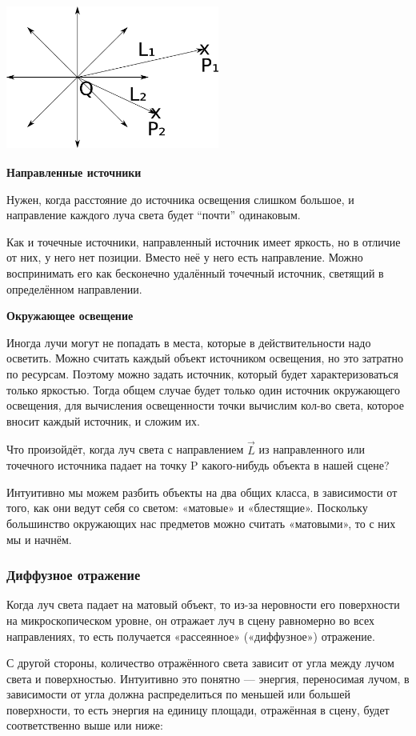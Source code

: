 \includegraphics[width=7cm, height=4.8cm]{light_vectors.png}

\textbf{Направленные источники}

Нужен, когда расстояние до источника освещения слишком большое, и направление каждого луча света будет “почти” одинаковым.

Как и точечные источники, направленный источник имеет яркость, но в отличие от них, у него нет позиции. Вместо неё у него есть направление. Можно воспринимать его как бесконечно удалённый точечный источник, светящий в определённом направлении.

\textbf{Окружающее освещение}

Иногда лучи могут не попадать в места, которые в действительности надо осветить.
Можно считать каждый объект источником освещения, но это затратно по ресурсам.
Поэтому можно задать источник, который будет характеризоваться только яркостью.
Тогда общем случае будет только один источник окружающего освещения,
для вычисления освещенности точки вычислим кол-во света, которое вносит каждый источник, и сложим их.

Что произойдёт, когда луч света с направлением $\vec{L}$ из направленного или точечного источника падает на точку P какого-нибудь объекта в нашей сцене?

Интуитивно мы можем разбить объекты на два общих класса, в зависимости от того, как они ведут себя со светом: «матовые» и «блестящие». Поскольку большинство окружающих нас предметов можно считать «матовыми», то с них мы и начнём.

\subsubsection{Диффузное отражение}
Когда луч света падает на матовый объект, то из-за неровности его поверхности на микроскопическом уровне, он отражает луч в сцену равномерно во всех направлениях, то есть получается «рассеянное» («диффузное») отражение.

С другой стороны, количество отражённого света зависит от угла между лучом света и поверхностью. Интуитивно это понятно — энергия, переносимая лучом, в зависимости от угла должна распределиться по меньшей или большей поверхности, то есть энергия на единицу площади, отражённая в сцену, будет соответственно выше или ниже:

